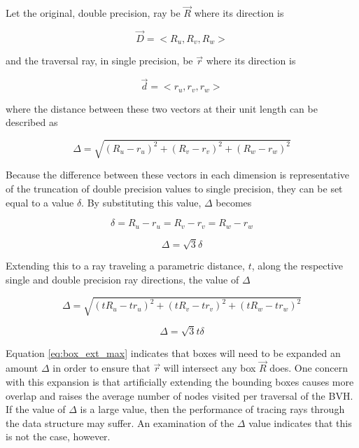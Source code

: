 Let the original, double precision, ray be $\vec{R}$ where its direction is

\begin{equation}
  \vec{D} = < R_{u}, R_{v}, R_{w} >
\end{equation}


and the traversal ray, in single precision, be $\vec{r}$ where its direction is

\begin{equation}
  \vec{d} = < r_{u}, r_{v}, r_{w} >
\end{equation}


where the distance between these two vectors at their unit length
can be described as

\begin{equation}
  \Delta = \sqrt{ (R_{u} - r_{u})^{2} + (R_{v} - r_{v})^{2} + (R_{w} -
    r_{w})^{2} }
\end{equation}

Because the difference between these vectors in each dimension is representative
of the truncation of double precision values to single precision, they can be
set equal to a value $\delta$. By substituting this value, $\Delta$ becomes

\begin{equation}
  \delta = R_{u} - r_{u} = R_{v} - r_{v} = R_{w} -  r_{w}
\end{equation}

\begin{equation}
  \Delta = \sqrt{3} \delta
\end{equation}

Extending this to a ray traveling a parametric distance, $t$, along the
respective single and double precision ray directions, the value of $\Delta$

\begin{equation}
  \Delta = \sqrt{ (tR_{u} - tr_{u})^{2} + (tR_{v} - tr_{v})^{2} + (tR_{w} -
    tr_{w})^{2} }
\end{equation}

\begin{equation}
  \Delta = \sqrt{3} t \delta
  \label{eq:box_ext_max}
\end{equation}

Equation \eqref{eq:box_ext_max} indicates that boxes will need to be expanded an amount $\Delta$
in order to ensure that $\vec{r}$ will intersect any box $\vec{R}$ does. One
concern with this expansion is that artificially extending the bounding boxes
causes more overlap and raises the average number of nodes visited per traversal
of the BVH. If the value of $\Delta$ is a large value, then the performance of
tracing rays through the data structure may suffer. An examination of the
$\Delta$ value indicates that this is not the case, however.

